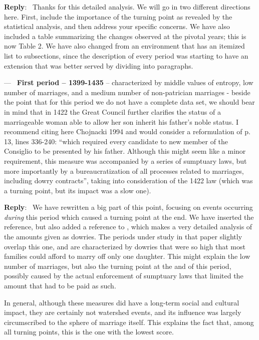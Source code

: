 \documentclass[11pt]{article}
\newcounter{reviewer}
\newcounter{point}[reviewer]
\renewcommand{\thepoint}{P\,\thereviewer.\arabic{point}}
\newenvironment{point}
   {\refstepcounter{point} \bigskip \noindent {\textbf{Reviewer~Point~\thepoint} } ---\ }
   {\par }
\newenvironment{reply}
   {\medskip \noindent \begin{sf}\textbf{Reply}:\  }
   {\medskip \end{sf}}
\begin{document}
\begin{reply}
  Thanks for this detailed analysis. We will go in two different directions
  here. First, include the importance of the turning point as revealed by the
  statistical analysis, and then address your specific concerns. We have also
  included a table summarizing the changes observed at the pivotal years; this
  is now Table 2. We have also changed from an environment that has an itemized
  list to subsections, since the description of every period was starting to
  have an extension that was better served by dividing into paragraphs.
\end{reply}

\begin{point}
  {\bf First period – 1399-1435} – characterized by middle values of entropy,
  low number of marriages, and a medium number of non-patrician marriages -
  beside the point that for this period we do not have a complete data set, we
  should bear in mind that in 1422 the Great Council further clarifies the
  status of a marriageable woman able to allow her son inherit his father’s
  noble status. I recommend citing here Chojnacki 1994 and would consider a
  reformulation of p. 13, lines 336-240: “which required every candidate to new
  member of the Consiglio to be presented by his father. Although this might
  seem like a minor requirement, this measure was accompanied by a series of
  sumptuary laws, but more importantly by a bureaucratization of all processes
  related to marriages, including dowry contracts”, taking into consideration of
  the 1422 law (which was a turning point, but its impact was a slow one).
\end{point}

\begin{reply}
We have rewritten a big part of this point, focusing on events occurring {\em
  during} this period which caused a turning point at the end. We have inserted
the reference, but also added a reference to \cite{10.2307/202860}, which makes
a very detailed analysis of the amounts given as dowries. The periods under
study in that paper slightly overlap this one, and are characterized by dowries
that were so high that most families could afford to marry off only one
daughter. This might explain the low number of marriages, but also the turning
point at the and of this period, possibly caused by the actual enforcement of
sumptuary laws that limited the amount that had to be paid as such.

In general, although these measures did have a long-term social and cultural
impact, they are certainly not watershed events, and its influence was largely
circumscribed to the sphere of marriage itself. This explains the fact that,
among all turning points, this is the one with the lowest score.
\end{reply}
\end{document}
